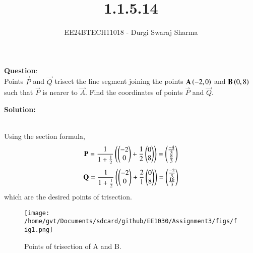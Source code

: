 \documentclass[journal]{IEEEtran}
\begin{document}

\vspace{3cm}

\title{1.1.5.14}
\author{EE24BTECH11018 - Durgi Swaraj Sharma
}
{\let\newpage\relax\maketitle}

\renewcommand{\thefigure}{\theenumi}
\renewcommand{\thetable}{\theenumi}
\setlength{\intextsep}{10pt} %


\renewcommand{\thetable}{\theenumi}


 \textbf{Question}:\\
Points $\vec{P}$ and $\vec{Q}$ trisect the line segment joining the points $\mathbf{A}\left(-2, 0\right)$ and $\mathbf{B}\left(0, 8\right)$ such that $\vec{P}$ is nearer to $\vec{A}$. Find the coordinates of points $\vec{P}$ and $\vec{Q}$. \hfill {}

\textbf{Solution: }\\
    \begin{table}[h!]    
      \centering
      
    \end{table}\\
 Using the section formula,
\begin{align}
	\mathbf{P} = \frac{1}{1+{\frac{1}{2}}}\left(\begin{pmatrix}-2 \\ 0\end{pmatrix}+\frac{1}{2}\begin{pmatrix}0 \\ 8\end{pmatrix}\right)=\begin{pmatrix}\frac{-4}{3} \\ \frac{8}{3}\end{pmatrix} \label{eq1.1.5.14.1}
\end{align}
\begin{align}
	\mathbf{Q} = \frac{1}{1+{\frac{1}{2}}}\left(\begin{pmatrix}-2 \\ 0\end{pmatrix}+\frac{2}{1}\begin{pmatrix}0 \\ 8\end{pmatrix}\right)=\begin{pmatrix}\frac{-2}{3} \\ \frac{16}{3}\end{pmatrix} \label{eq1.1.5.14.2}
\end{align}
which are the desired points of trisection.
    \begin{figure}[h]
        \centering
       \texttt{[image: /home/gvt/Documents/sdcard/github/EE1030/Assignment3/figs/fig1.png]}
       \caption{Points of trisection of A and B.}
       \label{graph}
    \end{figure}
\end{document}

